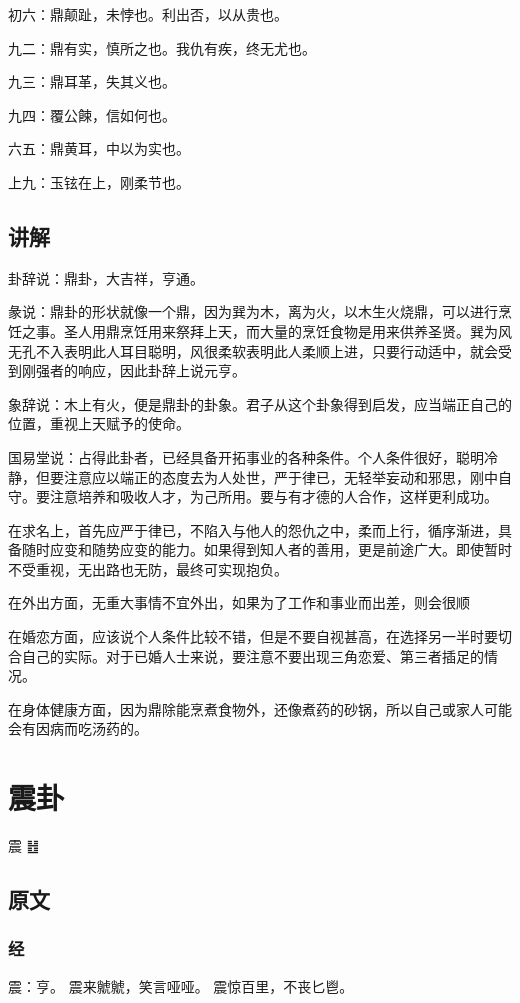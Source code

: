 \documentclass[12pt,oneside]{book}
\begin{document}
初六：鼎颠趾，未悖也。利出否，以从贵也。

九二：鼎有实，慎所之也。我仇有疾，终无尤也。

九三：鼎耳革，失其义也。

九四：覆公餗，信如何也。

六五：鼎黄耳，中以为实也。

上九：玉铉在上，刚柔节也。

\section{讲解}
卦辞说：鼎卦，大吉祥，亨通。

彖说：鼎卦的形状就像一个鼎，因为巽为木，离为火，以木生火烧鼎，可以进行烹饪之事。圣人用鼎烹饪用来祭拜上天，而大量的烹饪食物是用来供养圣贤。巽为风无孔不入表明此人耳目聪明，风很柔软表明此人柔顺上进，只要行动适中，就会受到刚强者的响应，因此卦辞上说元亨。

象辞说：木上有火，便是鼎卦的卦象。君子从这个卦象得到启发，应当端正自己的位置，重视上天赋予的使命。

国易堂说：占得此卦者，已经具备开拓事业的各种条件。个人条件很好，聪明冷静，但要注意应以端正的态度去为人处世，严于律已，无轻举妄动和邪思，刚中自守。要注意培养和吸收人才，为己所用。要与有才德的人合作，这样更利成功。

在求名上，首先应严于律已，不陷入与他人的怨仇之中，柔而上行，循序渐进，具备随时应变和随势应变的能力。如果得到知人者的善用，更是前途广大。即使暂时不受重视，无出路也无防，最终可实现抱负。

在外出方面，无重大事情不宜外出，如果为了工作和事业而出差，则会很顺

在婚恋方面，应该说个人条件比较不错，但是不要自视甚高，在选择另一半时要切合自己的实际。对于已婚人士来说，要注意不要出现三角恋爱、第三者插足的情况。

在身体健康方面，因为鼎除能烹煮食物外，还像煮药的砂锅，所以自己或家人可能会有因病而吃汤药的。




\chapter{震卦}
震 {\large ䷲}
\section{原文}

\subsection{经}
震：亨。 震来虩虩，笑言哑哑。 震惊百里，不丧匕鬯。
\end{document}
